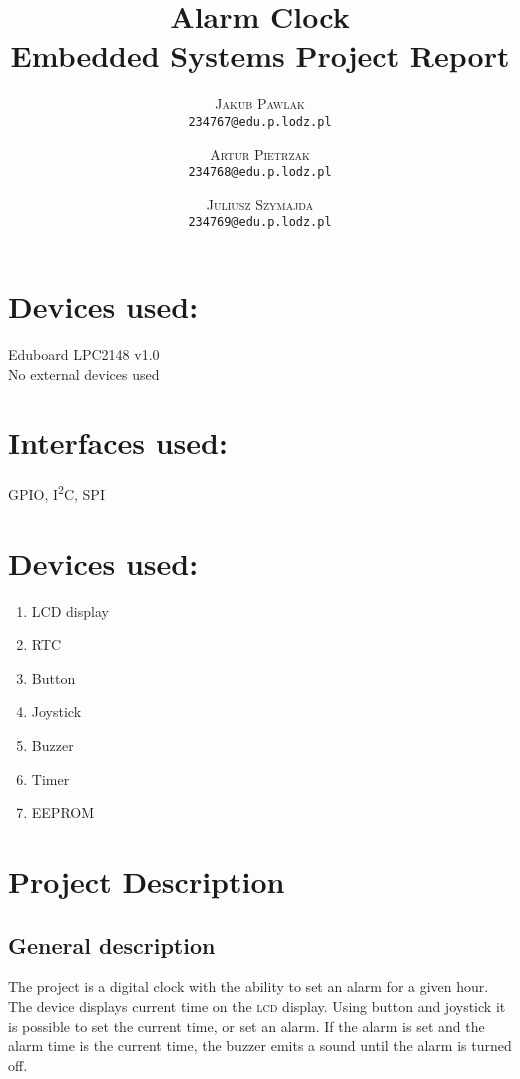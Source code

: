 \documentclass[10pt]{article}
\title{\huge\bf\vspace{-1em} Alarm Clock \\ Embedded Systems Project Report\\\vspace{2em}{\large\normalfont Monday 10:00 lab} }
\author{
    \textsc{Jakub Pawlak} \\
    \texttt{234767@edu.p.lodz.pl}\\
    \and
    \textsc{Artur Pietrzak} \\
    \texttt{234768@edu.p.lodz.pl}\\[1em]
    \and
    \textsc{Juliusz Szymajda} \\
    \texttt{234769@edu.p.lodz.pl}\\
}
\begin{document}
\maketitle
\clearpage
\large
\section*{Devices used:}
Eduboard LPC2148 v1.0 \\[1em]
No external devices used
\section*{Interfaces used:}
GPIO, I\textsuperscript{2}C, SPI
\section*{Devices used:}
\begin{enumerate}
	\item LCD display
	\item RTC
	\item Button
	\item Joystick
	\item Buzzer
	\item Timer
	\item EEPROM
\end{enumerate}
\clearpage
\tableofcontents
{}
\clearpage

\section{Project Description}
\subsection{General description}
The project is a digital clock with the ability to set an alarm for a given hour.
The device displays current time on the	\textsc{lcd} display.
Using button and joystick it is possible to set the current time, or set an alarm.
If the alarm is set and the alarm time is the current time, the buzzer emits a sound until the alarm is turned off.
\end{document}
